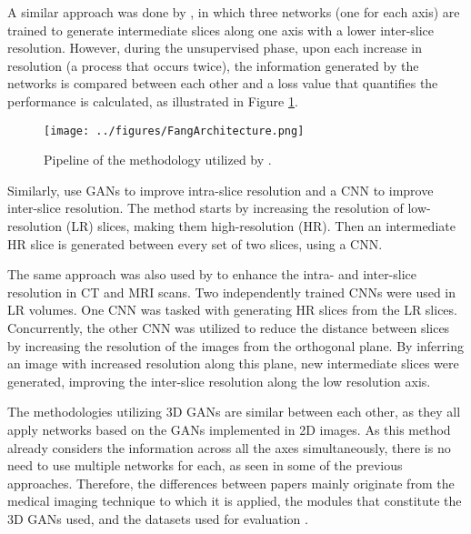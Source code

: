 A similar approach was done by \textcite{Fang2022}, in which three networks (one for each axis) are trained to generate intermediate slices along one axis with a lower inter-slice resolution. However, during the unsupervised phase, upon each increase in resolution (a process that occurs twice), the information generated by the networks is compared between each other and a loss value that quantifies the performance is calculated, as illustrated in Figure \ref{fig:FangArchitecture}.
\begin{figure}[!ht]
	\hspace*{-0.7in}
	\texttt{[image: ../figures/FangArchitecture.png]}
	\caption{Pipeline of the methodology utilized by \textcite{Fang2022}.}
	\label{fig:FangArchitecture}
\end{figure}
\par
Similarly, \textcite{Nimitha2024} use GANs to improve intra-slice resolution and a CNN to improve inter-slice resolution. The method starts by increasing the resolution of low-resolution (LR) slices, making them high-resolution (HR). Then an intermediate HR slice is generated between every set of two slices, using a CNN.
\par
The same approach was also used by \textcite{Georgescu2020} to enhance the intra- and inter-slice resolution in CT and MRI scans. Two independently trained CNNs were used in LR volumes. One CNN was tasked with generating HR slices from the LR slices. Concurrently, the other CNN was utilized to reduce the distance between slices by increasing the resolution of the images from the orthogonal plane. By inferring an image with increased resolution along this plane, new intermediate slices were generated, improving the inter-slice resolution along the low resolution axis.
\par
The methodologies utilizing 3D GANs are similar between each other, as they all apply networks based on the GANs implemented in 2D images. As this method already considers the information across all the axes simultaneously, there is no need to use multiple networks for each, as seen in some of the previous approaches. Therefore, the differences between papers mainly originate from the medical imaging technique to which it is applied, the modules that constitute the 3D GANs used, and the datasets used for evaluation \parencite{YChen2018, Sanchez2018, Kudo2019, Zhang2022}.
